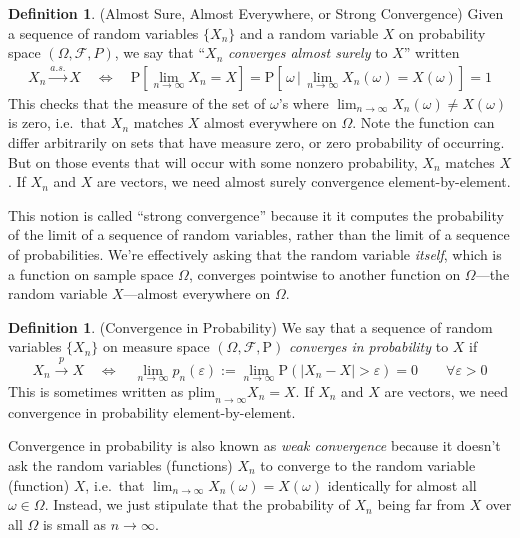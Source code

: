 \documentclass[12pt]{article}
\theoremstyle{plain}
\theoremstyle{definition}
\newtheorem{defn}[thm]{Definition}
\theoremstyle{remark}
\newcommand{\limn}{\lim_{n\rightarrow\infty}}
\newcommand{\Prb}{\mathrm{P}}
\newcommand{\sF}{\mathscr{F}}
\newcommand{\asto}{\xrightarrow{a.s.}}
\newcommand{\pto}{\xrightarrow{p}}
\newcommand{\plim}{\text{plim}_{n\rightarrow\infty}}
\begin{document}
\begin{defn}{(Almost Sure, Almost Everywhere, or Strong Convergence)}
Given a sequence of random variables $\{X_n\}$ and a random variable
$X$ on probability space $(\Omega,\sF,P)$, we say that ``$X_n$
\emph{converges almost surely} to $X$'' written
\begin{align*}
  X_n\asto X
  \quad \iff \quad
  \Prb\left[\limn X_n = X\right]
  = \Prb\left[\,\omega \,\big|\,\limn X_n(\omega) = X(\omega)\right]
  = 1
\end{align*}
This checks that the measure of the set of $\omega$'s where
$\limn X_n(\omega)\neq X(\omega)$ is zero, i.e.\ that $X_n$ matches $X$
almost everywhere on $\Omega$.
Note the function can differ arbitrarily on sets that have measure zero,
or zero probability of occurring. But on those events that will occur
with some nonzero probability, $X_n$ matches $X$.  If $X_n$ and $X$ are
vectors, we need almost surely convergence element-by-element.

This notion is called ``strong convergence'' because it it computes the
probability of the limit of a sequence of random variables, rather than
the limit of a sequence of probabilities. We're effectively asking that
the random variable \emph{itself}, which is a function on sample space
$\Omega$, converges pointwise to another function on $\Omega$---the
random variable $X$---almost everywhere on $\Omega$.
\end{defn}


\begin{defn}{(Convergence in Probability)}
We say that a sequence of random variables $\{ X_n \}$ on measure space
$(\Omega,\sF,\Prb)$ \emph{converges in probability} to $X$ if
\begin{equation}
  \label{plim}
  X_n\pto X
  \quad\iff\quad
  \limn p_n(\varepsilon) :=
  \limn
  \Prb(\left\lvert X_n - X \right\rvert > \varepsilon) = 0
  \qquad \forall  \varepsilon> 0
\end{equation}
This is sometimes written as $\plim X_n = X$.
If $X_n$ and $X$ are vectors, we need convergence in probability
element-by-element.

Convergence in probability is also known as \emph{weak convergence}
because it doesn't ask the random variables (functions) $X_n$ to
converge to the random variable (function) $X$, i.e.\ that
$\limn X_n(\omega)=X(\omega)$ identically for almost all
$\omega\in\Omega$.
Instead, we just stipulate that the probability of $X_n$ being far from
$X$ over all $\Omega$ is small as $n\rightarrow\infty$.
\end{defn}
\end{document}
